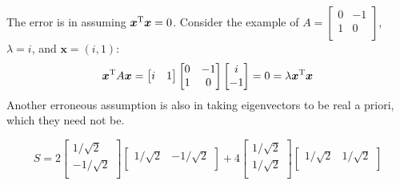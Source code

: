 \documentclass[a4paper]{article}
\begin{document}

The error is in assuming \(\bm{x}^{\textsc{T}}\bm{x} = 0\). Consider the example of \(A = 
\begin{bmatrix}
	0 & -1 \\
	1 & 0 \\
\end{bmatrix}\), \(\lambda = i\), and \(\bm{x} = \!\left( i,1 \right) \):
\[
	\bm{x}^{\textsc{T}}A \bm{x} =
	\begin{bmatrix}
		i & 1 \\
	\end{bmatrix}
	\begin{bmatrix}
		0 & -1 \\
		1 & 0 \\
	\end{bmatrix}
	\begin{bmatrix}
		i \\
		-1 \\
	\end{bmatrix}
	=
	0 = \lambda \bm{x}^{\textsc{T}}\bm{x}
\]
Another erroneous assumption is also in taking eigenvectors to be real a priori, which they need not be.

\[
	S = 2
	\begin{bmatrix}
		1/\sqrt{2} \\
		-1/\sqrt{2} \\
	\end{bmatrix}
	\begin{bmatrix}
		1/\sqrt{2} & -1/\sqrt{2} \\
	\end{bmatrix}
	+
	4
	\begin{bmatrix}
		1/\sqrt{2} \\
		1/\sqrt{2} \\
	\end{bmatrix}
	\begin{bmatrix}
		1/\sqrt{2} & 1/\sqrt{2} \\
	\end{bmatrix}
\]
\end{document}

